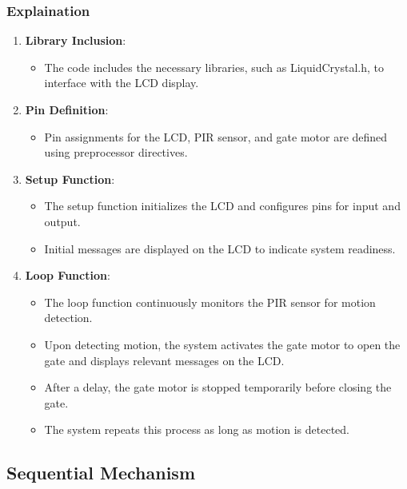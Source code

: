 \documentclass{article}
\begin{document}
\subsubsection{Explaination}
\begin{enumerate}
    \item \textbf{Library Inclusion}:
        \begin{itemize}
            \item The code includes the necessary libraries, such as LiquidCrystal.h, to interface with the LCD display.
        \end{itemize}
        
    \item \textbf{Pin Definition}:
        \begin{itemize}
            \item Pin assignments for the LCD, PIR sensor, and gate motor are defined using preprocessor directives.
        \end{itemize}
        
    \item \textbf{Setup Function}:
        \begin{itemize}
            \item The setup function initializes the LCD and configures pins for input and output.
            \item Initial messages are displayed on the LCD to indicate system readiness.
        \end{itemize}
        
    \item \textbf{Loop Function}:
        \begin{itemize}
            \item The loop function continuously monitors the PIR sensor for motion detection.
            \item Upon detecting motion, the system activates the gate motor to open the gate and displays relevant messages on the LCD.
            \item After a delay, the gate motor is stopped temporarily before closing the gate.
            \item The system repeats this process as long as motion is detected.
        \end{itemize}
\end{enumerate}








\subsection{Sequential Mechanism}
\end{document}

